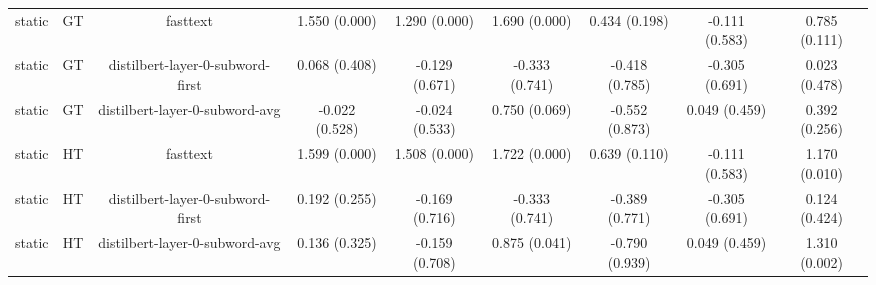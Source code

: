 \begin{sidewaystable}[htb]
\begin{tabular}{@{}ccccccccc@{}}
        static & GT & fasttext & 1.550 (0.000) & 1.290 (0.000) & 1.690 (0.000) & 0.434 (0.198) & -0.111 (0.583) & 0.785 (0.111) \\
        static & GT & distilbert-layer-0-subword-first & 0.068 (0.408) & -0.129 (0.671) & -0.333 (0.741) & -0.418 (0.785) & -0.305 (0.691) & 0.023 (0.478) \\
        static & GT & distilbert-layer-0-subword-avg & -0.022 (0.528) & -0.024 (0.533) & 0.750 (0.069) & -0.552 (0.873) & 0.049 (0.459) & 0.392 (0.256) \\
        static & HT & fasttext & 1.599 (0.000) & 1.508 (0.000) & 1.722 (0.000) & 0.639 (0.110) & -0.111 (0.583) & 1.170 (0.010) \\
        static & HT & distilbert-layer-0-subword-first & 0.192 (0.255) & -0.169 (0.716) & -0.333 (0.741) & -0.389 (0.771) & -0.305 (0.691) & 0.124 (0.424) \\
        static & HT & distilbert-layer-0-subword-avg & 0.136 (0.325) & -0.159 (0.708) & 0.875 (0.041) & -0.790 (0.939) & 0.049 (0.459) & 1.310 (0.002) \\
        \bottomrule
    \end{tabular}
\end{sidewaystable}